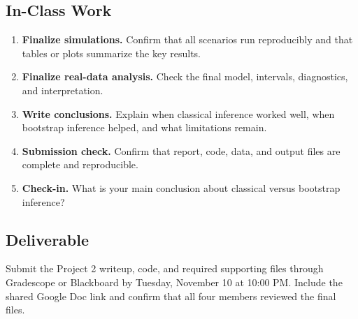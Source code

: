 \documentclass{article}
\newcommand{\submissionplatform}{Gradescope or Blackboard}
\newcommand{\duedate}{Tuesday, November 10 at 10:00 PM}
\begin{document}
\subsection*{In-Class Work}
\begin{enumerate}[label={\bfseries (\Alph*)},itemsep=.5em]
  \item \textbf{Finalize simulations.} Confirm that all scenarios run reproducibly and that tables or plots summarize the key results.
  \item \textbf{Finalize real-data analysis.} Check the final model, intervals, diagnostics, and interpretation.
  \item \textbf{Write conclusions.} Explain when classical inference worked well, when bootstrap inference helped, and what limitations remain.
  \item \textbf{Submission check.} Confirm that report, code, data, and output files are complete and reproducible.
  \item \textbf{Check-in.} What is your main conclusion about classical versus bootstrap inference?
\end{enumerate}

\subsection*{Deliverable}
Submit the Project 2 writeup, code, and required supporting files through \submissionplatform{} by \duedate{}. Include the shared Google Doc link and confirm that all four members reviewed the final files.
\end{document}
